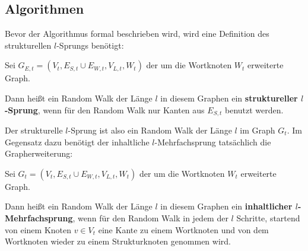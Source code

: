 \subsection{Algorithmen}
Bevor der Algorithmus formal beschrieben wird, wird eine Definition
des strukturellen $l$-Sprungs benötigt:
\begin{definition}
    Sei $G_{E,t} = (V_t, E_{S,t} \cup E_{W,t}, V_{L,t}, W_{t})$ der
    um die Wortknoten $W_{t}$ erweiterte Graph.

    Dann heißt ein Random Walk der Länge $l$ in diesem Graphen
    ein \textbf{struktureller $l$-Sprung}, wenn für den Random Walk
    nur Kanten aus $E_{S,t}$ benutzt werden.
\end{definition}

Der strukturelle $l$-Sprung ist also ein Random Walk der Länge $l$
im Graph $G_t$. Im Gegensatz dazu benötigt der inhaltliche $l$-Mehrfachsprung
tatsächlich die Grapherweiterung:

\begin{definition}
    Sei $G_t = (V_t, E_{S,t} \cup E_{W,t}, V_{L,t}, W_{t})$ der
    um die Wortknoten $W_{t}$ erweiterte Graph.

    Dann heißt ein Random Walk der Länge $l$ in diesem Graphen
    ein \textbf{inhaltlicher $l$-Mehrfachsprung}, wenn für den Random Walk
    in jedem der $l$ Schritte, startend von einem Knoten $v \in V_t$
    eine Kante zu einem Wortknoten und von dem Wortknoten wieder 
    zu einem Strukturknoten genommen wird.
\end{definition}

